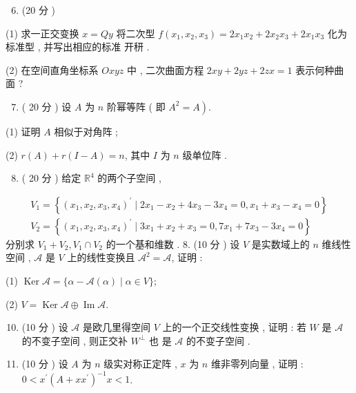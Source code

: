\documentclass[10pt]{article}
\begin{document}
{\begin{enumerate}
  \setcounter{enumi}{5}
  \item (20  分 )
\end{enumerate}
(1)  求一正交变换  $x=Q y$  将二次型  $f\left(x_{1}, x_{2}, x_{3}\right)=2 x_{1} x_{2}+2 x_{2} x_{3}+2 x_{1} x_{3}$  化为标准型 ,  并写出相应的标准   开䄯 .

(2)  在空间直角坐标系  $O x y z$  中 ,  二次曲面方程  $2 x y+2 y z+2 z x=1$  表示何种曲面 ?

\begin{enumerate}
  \setcounter{enumi}{6}
  \item ( 20  分 )  设  $A$  为  $n$  阶幂等阵  ( 即  $\left.A^{2}=A\right)$.
\end{enumerate}
(1)  证明  $A$  相似于对角阵 ;

(2) $r(A)+r(I-A)=n$,  其中  $I$  为  $n$  级单位阵 .

\begin{enumerate}
  \setcounter{enumi}{7}
  \item ( 20  分 )  给定  $\mathbb{R}^{4}$  的两个子空间 ,
\end{enumerate}
$$
\begin{gathered}
V_{1}=\left\{\left(x_{1}, x_{2}, x_{3}, x_{4}\right)^{\prime} \mid 2 x_{1}-x_{2}+4 x_{3}-3 x_{4}=0, x_{1}+x_{3}-x_{4}=0\right\} \\
V_{2}=\left\{\left(x_{1}, x_{2}, x_{3}, x_{4}\right)^{\prime} \mid 3 x_{1}+x_{2}+x_{3}=0,7 x_{1}+7 x_{3}-3 x_{4}=0\right\}
\end{gathered}
$$
 分别求  $V_{1}+V_{2}, V_{1} \cap V_{2}$  的一个基和维数 . 8. (10  分 )  设  $V$  是实数域上的  $n$  维线性空间 , $\mathscr{A}$  是  $V$  上的线性变换且  $\mathscr{A}^{2}=\mathscr{A}$,  证明 :

(1) $\operatorname{Ker} \mathscr{A}=\{\alpha-\mathscr{A}(\alpha) \mid \alpha \in V\}$;

(2) $V=\operatorname{Ker} \mathscr{A} \oplus \operatorname{Im} \mathscr{A}$.

\begin{enumerate}
  \setcounter{enumi}{9}
  \item (10  分 )  设  $\mathscr{A}$  是欧几里得空间  $V$  上的一个正交线性变换 ,  证明 :  若  $W$  是  $\mathscr{A}$  的不变子空间 ,  则正交补  $W^{\perp}$  也   是  $\mathscr{A}$  的不变子空间 .

  \item (10  分 )  设  $A$  为  $n$  级实对称正定阵 , $x$  为  $n$  维非零列向量 ,  证明 : $0<x^{\prime}\left(A+x x^{\prime}\right)^{-1} x<1$.


\end{enumerate}}
\end{document}
